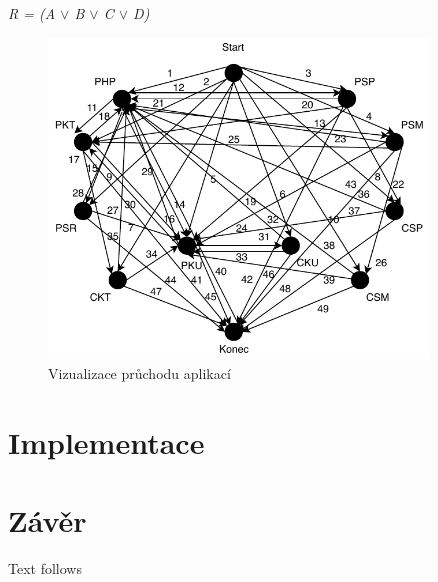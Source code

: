 \documentclass{ctuthesis}
\begin{document}
	\maketitle

	

	
 
	
	  
  	  

	\begin{center}
		\textit{R = (A $\lor$ B $\lor$ C $\lor$ D)}
	\end{center}
 
 	\begin{figure}[H]
 		\includegraphics[width=0.9\textwidth]{process_app}
 		\caption{Vizualizace průchodu aplikací}
	 \end{figure}
	
	\chapter{Implementace}

	\chapter{Závěr}
	Text follows
	
	
	
	
	
	
	
	
	
	
\end{document}
